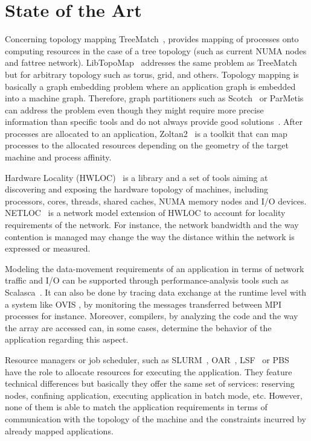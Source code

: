 \section{State of the Art}
Concerning topology mapping TreeMatch~\cite{jmt14b}, provides mapping
of processes onto computing resources in the case of a tree topology (such as
current NUMA nodes and fattree
network). LibTopoMap~\cite{DBLP:conf/ics/HoeflerS11} addresses the same problem as
TreeMatch but for arbitrary topology such as torus, grid, and others. Topology mapping is basically a graph embedding problem 
where an application graph is embedded into a machine graph.  Therefore, graph partitioners 
such as Scotch~\cite{scotch-man} or ParMetis~\cite{karypis2003parmetis} can address the
problem even though they might require more precise information than specific
tools and do not always provide good solutions~\cite{jmt14b}.  
After processes are allocated to an application, Zoltan2~\cite{zoltan2,drl+14} is a 
toolkit that can map processes to the allocated resources depending on the geometry of the 
target machine and process affinity.


Hardware Locality (HWLOC)~\cite{hwloc} is a library and a set of tools aiming at
discovering and exposing the hardware topology of machines, including
processors, cores, threads, shared caches, NUMA memory nodes and I/O devices.
NETLOC~\cite{netloc} is a network model extension of HWLOC to account for locality
requirements of the network. For instance, the network bandwidth and the way
contention is managed may change the way the distance within the network is
expressed or measured. 

Modeling the data-movement requirements of an application in terms of
network traffic and I/O can be supported through performance-analysis tools
such as Scalasca~\cite{geimer_ea:2010:scalascaarchitecture}. It can also be done
by tracing data exchange at the runtime level with a system like OVIS \cite{OVIS}, by monitoring the
messages transferred between MPI processes for instance. Moreover, compilers, by analyzing
the code and the way the array are accessed can, in some cases, determine the
behavior of the application regarding this aspect. 

Resource managers or job scheduler, such as SLURM~\cite{yoo2003slurm},
OAR~\cite{capit2005batch,}, LSF~\cite{zhou1992lsf}
or PBS~\cite{henderson1995job} have the role to allocate resources for executing the
application. They feature technical differences but basically they offer the
same set of services: reserving nodes, confining application, executing
application in batch mode, etc. However, none of them is able to match the
application requirements in terms of communication with the topology of the
machine and the constraints incurred by already mapped applications. 


